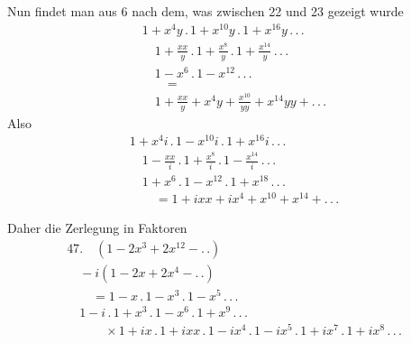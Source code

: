 Nun findet man aus 6 nach dem, was zwischen 22 und 23 gezeigt wurde
\[
\begin{gathered}
1+x^4y\,.\,1+x^{10}y\,.\,1+x^{16}y\,.\,.\,.\,
\\[8pt]\quad{}1+\frac{xx}{y}\,.\,1+\frac{x^8}{y}\,.\,1+\frac{x^{14}}{y}\,.\,.\,.\,\\[8pt]\quad{}
1-x^6\,.\,1-x^{12}\,.\,.\,.\\[8pt]
\qquad=\\[8pt]\quad{}1+\frac{xx}{y}+x^4y+\frac{x^{10}}{yy}+x^{14}yy+ .\,.\,.
\end{gathered}
\]
Also
\[
\begin{gathered}
1+x^4i\,.\,1-x^{10}i\,.\,1+x^{16}i\,.\,.\,.\,
\\[8pt]\quad{}1-\frac{xx}{i}\,.\,1+\frac{x^8}{i}\,.\,1-\frac{x^{14}}{i}\,.\,.\,.\,\\[8pt]\quad{}
1+x^6\,.\,1-x^{12}\,.\,1+x^{18}\,.\,.\,.\\[8pt]
\qquad=1+ixx+ix^4+x^{10}+x^{14}+ .\,.\,.
\end{gathered}
\]

Daher die Zerlegung in Faktoren
\[
\begin{gathered}
47.\quad (1-2x^3+2x^{12}- .\,.)\\[8pt]\quad{}-i(1-2x+2x^4- .\,.)\\[8pt]
\qquad=1-x\,.\,1-x^3\,.\,1-x^5\,.\,.\,.\,\\[8pt]\quad{}
1-i\,.\,1+x^3\,.\,1-x^6\,.\,1+x^9\,.\,.\,.\\[8pt]
\qquad\quad\times1+ix\,.\,1+ixx\,.\,1-ix^4\,.\,1-ix^5\,.\,1+ix^7\,.\,1+ix^8\,.\,.\,.
\end{gathered}
\]
\clearpage
\endgroup

